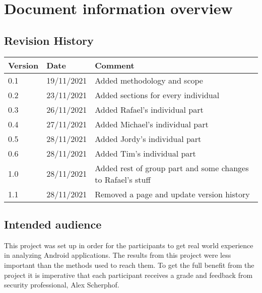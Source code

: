 \section*{Document information overview}
\subsection*{Revision History}

\begin{tabularx}{\textwidth}{|l|l|X|}
  \hline
  \textbf{Version} & \textbf{Date} & \textbf{Comment}                  \\ \hline
  0.1              & 19/11/2021    & Added methodology and scope       \\ \hline
  0.2              & 23/11/2021    & Added sections for every individual \\ \hline
  0.3              & 26/11/2021    & Added Rafael's individual part      \\ \hline
  0.4              & 27/11/2021    & Added Michael's individual part      \\ \hline
  0.5              & 28/11/2021    & Added Jordy's individual part      \\ \hline
  0.6              & 28/11/2021    & Added Tim's individual part      \\ \hline
  1.0              & 28/11/2021    & Added rest of group part and some changes to Rafael's stuff      \\ \hline
  1.1              & 28/11/2021    & Removed a page and update version history     \\ \hline
\end{tabularx}

\subsection*{Intended audience}

This project was set up in order for the participants to get real world experience in analyzing Android applications.
The results from this project were less important than the methods used to reach them.
To get the full benefit from the project it is imperative that each participant receives a grade and feedback from security professional, Alex Scherphof.

\newpage
